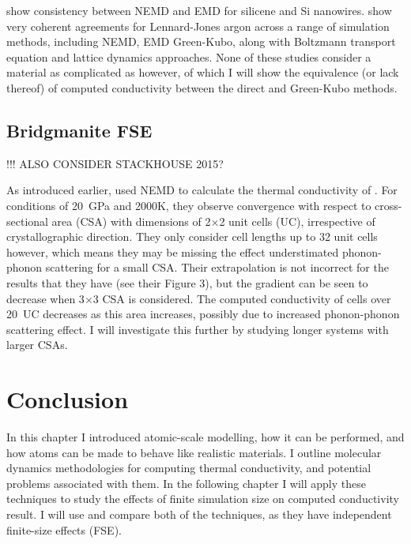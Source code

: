 \citet{Dong2018} show consistency between NEMD and EMD for silicene and Si nanowires. \citet{Turney2009} show very coherent agreements for Lennard-Jones argon across a range of simulation methods, including NEMD, EMD Green-Kubo, along with Boltzmann transport equation and lattice dynamics approaches. None of these studies consider a material as complicated as \bdgs however, of which I will show the equivalence (or lack thereof) of computed conductivity between the direct and Green-Kubo methods.

\subsection{Bridgmanite FSE}

!!! ALSO CONSIDER STACKHOUSE 2015?

As introduced earlier, \citet{Ammann2014} used NEMD to calculate the thermal conductivity of \bdg. For conditions of 20~GPa and 2000K, they observe convergence with respect to cross-sectional area (CSA) with dimensions of 2$\times$2 unit cells (UC), irrespective of crystallographic direction. They only consider cell lengths up to 32 unit cells however, which means they may be missing the effect understimated phonon-phonon scattering for a small CSA. Their extrapolation is not incorrect for the results that they have (see their Figure 3), but the gradient can be seen to decrease when 3$\times$3 CSA is considered. The computed conductivity of cells over 20~UC decreases as this area increases, possibly due to increased phonon-phonon scattering effect. I will investigate this further by studying longer systems with larger CSAs.



\section{Conclusion}

In this chapter I introduced atomic-scale modelling, how it can be performed, and how atoms can be made to behave like realistic materials. I outline molecular dynamics methodologies for computing thermal conductivity, and potential problems associated with them. In the following chapter I will apply these techniques to study the effects of finite simulation size on computed \bdgs conductivity result. I will use and compare both of the techniques, as they have independent finite-size effects (FSE).

